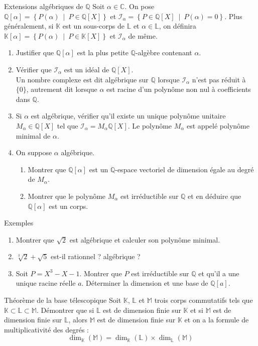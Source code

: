 \documentclass[french,a4paper]{article}
\newcommand{\Q}{\mathbb{Q}}
\newcommand{\C}{\mathbb{C}}
\newcommand{\K}{\mathbb{K}}
\renewcommand{\L}{\mathbb{L}}
\theoremstyle{plain}
\theoremstyle{definition}
\theoremstyle{remark}
\begin{document}
\begin{ex}[Châteaux]{Extensions algébriques de $\Q$}
	Soit $\alpha\in\C$. On pose $\Q[\alpha]=\left\{P(\alpha)\ \mid\ P\in\Q[X]\right\}$ et $\mathcal{I}_\alpha=\left\{P\in\Q[X]\ \mid\ P(\alpha)=0\right\}$. Plus généralement, si $\K$ est un sous-corps de $\L$ et $\alpha\in\L$, on définira $\K[\alpha]=\left\{P(\alpha)\ \mid\ P\in\K[X]\right\}$ et $\mathcal{I}_\alpha$ de même.
	\begin{enumerate}
		\item Justifier que $\Q[\alpha]$ est la plus petite $\Q$-algèbre contenant $\alpha$.
		\item Vérifier que $\mathcal{I}_\alpha$ est un idéal de $\Q[X]$. \\
		Un nombre complexe est dit algébrique sur $\Q$ lorsque $\mathcal{I}_\alpha$ n'est pas réduit à $\{0\}$, autrement dit lorsque $\alpha$ est racine d'un polynôme non nul à coefficients dans $\Q$.
		\item Si $\alpha$ est algébrique, vérifier qu'il existe un unique polynôme unitaire $M_\alpha\in\Q[X]$ tel que $\mathcal{I}_\alpha=M_\alpha\Q[X]$. Le polynôme $M_\alpha$ est appelé polynôme minimal de $\alpha$.
		\item On suppose $\alpha$ algébrique.
		\begin{enumerate}[label=\alph*.]
			\item Montrer que $\Q[\alpha]$ est un $\Q$-espace vectoriel de dimension égale au degré de $M_\alpha$.
			\item Montrer que le polynôme $M_\alpha$ est irréductible sur $\Q$ et en déduire que $\Q[\alpha]$ est un corps.
		\end{enumerate} 
	\end{enumerate}
\end{ex}

\begin{ex}[Châteaux]{Exemples}
	\begin{enumerate}
		\item Montrer que $\sqrt{2}$ est algébrique et calculer son polynôme minimal.
		\item $\sqrt[3]{2}+\sqrt{5}$ est-il rationnel ? algébrique ?
		\item Soit $P=X^3-X-1$. Montrer que $P$ est irréductible sur $\Q$ et qu'il a une unique racine réelle $a$. Déterminer la dimension et une base de $\Q[a]$.
	\end{enumerate}
\end{ex}

\begin{ex}[Châteaux]{Théorème de la base télescopique}
	Soit $\K$, $\L$ et $\mathbb{M}$ trois corps commutatifs tels que $\K\subset\L\subset\mathbb{M}$. Démontrer que si $\L$ est de dimension finie sur $\K$ et si $\mathbb{M}$ est de dimension finie sur $\L$, alors $\mathbb{M}$ est de dimension finie sur $\K$ et on a la formule de multiplicativité des degrés : $$\dim_\K(\mathbb{M})=\dim_\K(\L)\times\dim_\L(\mathbb{M})$$
\end{ex}
\end{document}
